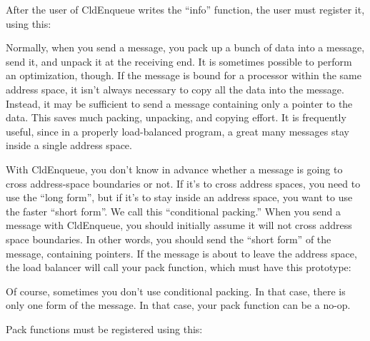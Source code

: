 After the user of CldEnqueue writes the ``info'' function, the
user must register it, using this:


Normally, when you send a message, you pack up a bunch of data into a
message, send it, and unpack it at the receiving end.  It is sometimes
possible to perform an optimization, though.  If the message is bound
for a processor within the same address space, it isn't always
necessary to copy all the data into the message.  Instead, it may be
sufficient to send a message containing only a pointer to the data.
This saves much packing, unpacking, and copying effort.  It is
frequently useful, since in a properly load-balanced program, a great
many messages stay inside a single address space.

With CldEnqueue, you don't know in advance whether a message is
going to cross address-space boundaries or not.  If it's to cross
address spaces, you need to use the ``long form'', but if it's to stay
inside an address space, you want to use the faster ``short form''.
We call this ``conditional packing.''  When you send a message with
CldEnqueue, you should initially assume it will not cross
address space boundaries.  In other words, you should send the ``short
form'' of the message, containing pointers.  If the message is about
to leave the address space, the load balancer will call your pack
function, which must have this prototype:


Of course, sometimes you don't use conditional packing.  In that case,
there is only one form of the message.  In that case, your pack
function can be a no-op.

Pack functions must be registered using this:


